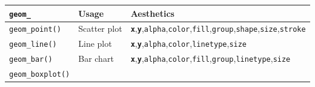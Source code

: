\documentclass[
]{book}
\begin{document}
\begin{longtable}[]{@{}lll@{}}
\toprule
\begin{minipage}[b]{0.13\columnwidth}\raggedright
\texttt{geom\_}\strut
\end{minipage} & \begin{minipage}[b]{0.14\columnwidth}\raggedright
Usage\strut
\end{minipage} & \begin{minipage}[b]{0.65\columnwidth}\raggedright
Aesthetics\strut
\end{minipage}\tabularnewline
\midrule
\endhead
\begin{minipage}[t]{0.13\columnwidth}\raggedright
\texttt{geom\_point()}\strut
\end{minipage} & \begin{minipage}[t]{0.14\columnwidth}\raggedright
Scatter plot\strut
\end{minipage} & \begin{minipage}[t]{0.65\columnwidth}\raggedright
\textbf{\texttt{x}},\textbf{\texttt{y}},\texttt{alpha},\texttt{color},\texttt{fill},\texttt{group},\texttt{shape},\texttt{size},\texttt{stroke}\strut
\end{minipage}\tabularnewline
\begin{minipage}[t]{0.13\columnwidth}\raggedright
\texttt{geom\_line()}\strut
\end{minipage} & \begin{minipage}[t]{0.14\columnwidth}\raggedright
Line plot\strut
\end{minipage} & \begin{minipage}[t]{0.65\columnwidth}\raggedright
\textbf{\texttt{x}},\textbf{\texttt{y}},\texttt{alpha},\texttt{color},\texttt{linetype},\texttt{size}\strut
\end{minipage}\tabularnewline
\begin{minipage}[t]{0.13\columnwidth}\raggedright
\texttt{geom\_bar()}\strut
\end{minipage} & \begin{minipage}[t]{0.14\columnwidth}\raggedright
Bar chart\strut
\end{minipage} & \begin{minipage}[t]{0.65\columnwidth}\raggedright
\textbf{\texttt{x}},\textbf{\texttt{y}},\texttt{alpha},\texttt{color},\texttt{fill},\texttt{group},\texttt{linetype},\texttt{size}\strut
\end{minipage}\tabularnewline
\begin{minipage}[t]{0.13\columnwidth}\raggedright
\texttt{geom\_boxplot()}\strut

\end{minipage}
\end{longtable}
\end{document}

